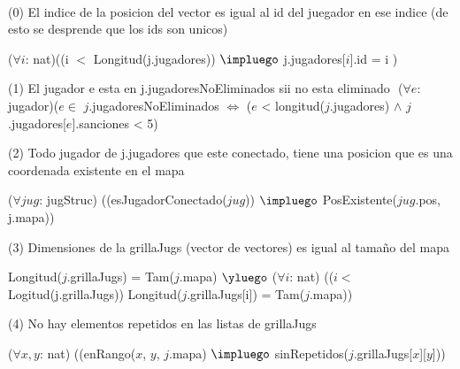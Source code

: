 \begin{Representacion}
    \begin{Tupla}[jugYCantCapt]
    \end{Tupla}


$ $\newline
$ $\newline


$ $\newline

(0) El indice de la posicion del vector es igual al id del juegador en ese indice (de esto se desprende que los ids son unicos) $ $\newline

($\forall i$: nat)((i $<$ Longitud(j.jugadores)) $\impluego$ j.jugadores[$i$].id = i )
$ $\newline


(1) El jugador e esta en j.jugadoresNoEliminados sii no esta eliminado $ $\newline
($\forall e$: jugador)($e \in$ $j$.jugadoresNoEliminados $\iff$ ($e$ < longitud($j$.jugadores) $\land$ $j$.jugadores[$e$].sanciones < 5)
$ $\newline

(2) Todo jugador de j.jugadores que este conectado, tiene una posicion que es una coordenada existente en el mapa $ $\newline

($\forall jug$: jugStruc) ((esJugadorConectado($jug$)) $\impluego$ PosExistente($jug$.pos, j.mapa))
$ $\newline


(3) Dimensiones de la grillaJugs (vector de vectores) es igual al tama\~no del mapa $ $\newline

Longitud($j$.grillaJugs) = Tam($j$.mapa) $\yluego$ 
($\forall i$: nat) (($i <$ Logitud(j.grillaJugs)) Longitud($j$.grillaJugs[i]) = Tam($j$.mapa)) 
$ $\newline


(4) No hay elementos repetidos en las listas de grillaJugs  $ $\newline

($\forall x, y$: nat) ((enRango($x$, $y$, $j$.mapa) $\impluego$ sinRepetidos($j$.grillaJugs[$x$][$y$]))
$ $\newline


\end{Representacion}
